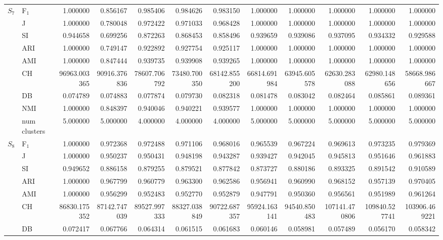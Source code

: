 \begin{tabular}{llrrrrrrrrrr}
\multirow[c]{9}{*}{$S_{7}$} & F$_1$ & 1.000000 & 0.856167 & 0.985406 & 0.984626 & 0.983150 & 1.000000 & 1.000000 & 1.000000 & 1.000000 & 1.000000 \\
 & J & 1.000000 & 0.780048 & 0.972422 & 0.971033 & 0.968428 & 1.000000 & 1.000000 & 1.000000 & 1.000000 & 1.000000 \\
 & SI & 0.944658 & 0.699256 & 0.872263 & 0.868453 & 0.858496 & 0.939659 & 0.939086 & 0.937095 & 0.934332 & 0.929588 \\
 & ARI & 1.000000 & 0.749147 & 0.922892 & 0.927754 & 0.925117 & 1.000000 & 1.000000 & 1.000000 & 1.000000 & 1.000000 \\
 & AMI & 1.000000 & 0.847444 & 0.939735 & 0.939908 & 0.939265 & 1.000000 & 1.000000 & 1.000000 & 1.000000 & 1.000000 \\
 & CH & 96963.003365 & 90916.376836 & 78607.706792 & 73480.700350 & 68142.855200 & 66814.691984 & 63945.605578 & 62630.283088 & 62980.148656 & 58668.986667 \\
 & DB & 0.074789 & 0.074883 & 0.077874 & 0.079730 & 0.082318 & 0.081478 & 0.083042 & 0.082464 & 0.085861 & 0.089361 \\
 & NMI & 1.000000 & 0.848397 & 0.940046 & 0.940221 & 0.939577 & 1.000000 & 1.000000 & 1.000000 & 1.000000 & 1.000000 \\
 & num clusters & 5.000000 & 5.000000 & 4.000000 & 4.000000 & 4.000000 & 5.000000 & 5.000000 & 5.000000 & 5.000000 & 5.000000 \\
\multirow[c]{9}{*}{$S_{8}$} & F$_1$ & 1.000000 & 0.972368 & 0.972488 & 0.971106 & 0.968016 & 0.965539 & 0.967224 & 0.969613 & 0.973235 & 0.979369 \\
 & J & 1.000000 & 0.950237 & 0.950431 & 0.948198 & 0.943287 & 0.939427 & 0.942045 & 0.945813 & 0.951646 & 0.961883 \\
 & SI & 0.949652 & 0.886158 & 0.879255 & 0.879521 & 0.877842 & 0.873727 & 0.880186 & 0.893325 & 0.891542 & 0.910589 \\
 & ARI & 1.000000 & 0.967799 & 0.960779 & 0.963300 & 0.962586 & 0.956941 & 0.960990 & 0.968152 & 0.957139 & 0.970405 \\
 & AMI & 1.000000 & 0.956299 & 0.952483 & 0.952770 & 0.952879 & 0.947791 & 0.950360 & 0.956561 & 0.951989 & 0.961264 \\
 & CH & 86830.175352 & 87142.747039 & 89527.997333 & 88327.038849 & 90722.687357 & 95924.163141 & 94540.850483 & 107141.470806 & 109840.527741 & 103906.469221 \\
 & DB & 0.072417 & 0.067766 & 0.064314 & 0.061515 & 0.061683 & 0.060146 & 0.058981 & 0.057489 & 0.056170 & 0.058342 \\

\end{tabular}
